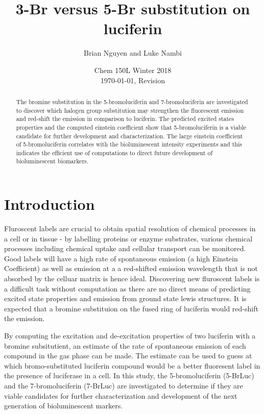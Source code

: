 \documentclass[11pt]{article}
\title{\textbf{3-Br versus 5-Br substitution on luciferin}}
\author{Brian Nguyen and Luke Nambi}
\date{Chem 150L Winter 2018 \\ \today, Revision \Revision}
\begin{document}
\maketitle

\begin{abstract}
  \noindent
  The bromine substitution in the 5-bromoluciferin and 7-bromoluciferin are
  investigated to discover which halogen group substitution 
  may strengthen the
  fluorescent emission and red-shift the emission in 
  comparison to luciferin.
  The predicted excited states properties 
  and the computed einstein coefficient
  show that 5-bromoluciferin is a viable candidate for further development
  and characterization. The large einstein coefficient of 5-bromoluciferin
  correlates with the bioluminescent 
  intensity experiments and this indicates
  the efficient use of computations 
  to direct future development of bioluminescent
  biomarkers.
\end{abstract}

\section{Introduction}

Fluroscent labels are crucial to obtain spatial resolution of
chemical processes in a cell or in tissue - by labelling
proteins or enzyme substrates, various chemical processes
including chemical uptake and cellular transport can be
monitored. Good labels will have a high rate of spontaneous
emission (a high Einstein Coefficient) as well as emission at a
a red-shifted emission wavelength that is not absorbed by the
celluar matrix is hence ideal.\cite{doi:10.1002/cbic.201600564} Discovering
new fluroscent labels is a difficult
task without computation as there are no direct
means of predicting excited state properties and emission
from ground state lewis structures. It is expected that a
bromine substituion on the fused ring of luciferin
would red-shift the emission.

By computing the excitation and de-excitation properties of two
luciferin with a bromine subsitutient, an estimate of the rate of
spontaneous emission of each compound in the gas phase can be made.
The estimate can be used to guess at which bromo-substituted
luciferin compound would be a better fluoresent label in the
presence of luciferase in a cell. In this study, the 5-bromoluciferin
(5-BrLuc) and the 7-bromoluciferin (7-BrLuc) are investigated
to determine if they are viable candidates for further characterization
and development of the next generation of bioluminescent markers. 
\end{document}
